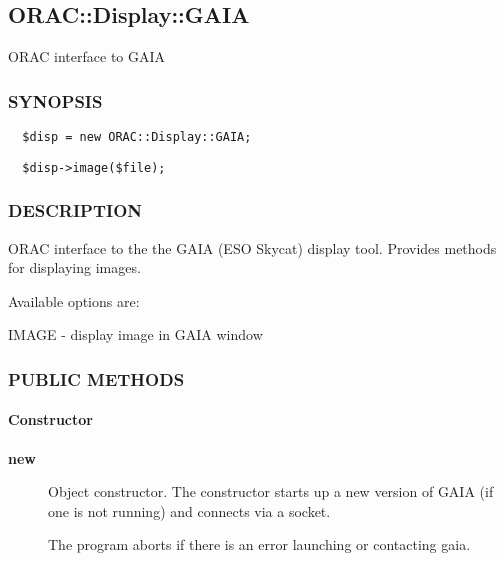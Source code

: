 \subsection{ORAC::Display::GAIA\label{ORAC::Display::GAIA}}

ORAC interface to GAIA

\subsubsection*{SYNOPSIS\label{ORAC::Display::GAIA_SYNOPSIS}}\begin{verbatim}
  $disp = new ORAC::Display::GAIA;
\end{verbatim}
\begin{verbatim}
  $disp->image($file);
\end{verbatim}
\subsubsection*{DESCRIPTION\label{ORAC::Display::GAIA_DESCRIPTION}}

ORAC interface to the the GAIA (ESO Skycat) display tool. Provides methods
for displaying images.



Available options are:



IMAGE - display image in GAIA window

\subsubsection*{PUBLIC METHODS\label{ORAC::Display::GAIA_PUBLIC_METHODS}}\paragraph*{Constructor\label{ORAC::Display::GAIA_Constructor}}\begin{description}
\item[\textbf{new}] \mbox{}

Object constructor. The constructor starts up a new version of
GAIA (if one is not running) and connects via a socket.



The program aborts if there is an error launching or contacting
gaia.

\end{description}
